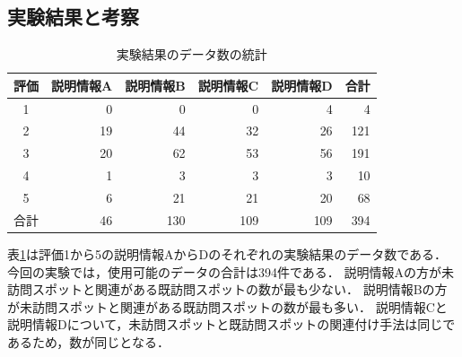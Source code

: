 \documentclass{deimj}
\begin{document}
\subsection{実験結果と考察}
\label{subsec:実験結果}

\begin{table}[t]
  \caption{実験結果のデータ数の統計}
  \label{table:実験結果のデータ数の統計}
  \centering
  \begin{tabular}{c|r|r|r|r|r}
  \hline
  評価 & \multicolumn{1}{c|}{説明情報A} & \multicolumn{1}{c|}{説明情報B} & \multicolumn{1}{c|}{説明情報C} & \multicolumn{1}{c|}{説明情報D} & \multicolumn{1}{c}{合計} \\ \hline
  1  & 0                      & 0                      & 0                      & 4                      & 4                      \\
  2  & 19                     & 44                     & 32                     & 26                     & 121                    \\
  3  & 20                     & 62                     & 53                     & 56                     & 191                    \\
  4  & 1                      & 3                      & 3                      & 3                      & 10                     \\
  5  & 6                      & 21                     & 21                     & 20                     & 68                     \\\hline
  合計 & 46                     & 130                    & 109                    & 109                    & 394                    \\ \hline
  \end{tabular}
\end{table}

表\ref{table:実験結果のデータ数の統計}は評価1から5の説明情報AからDのそれぞれの実験結果のデータ数である．
今回の実験では，使用可能のデータの合計は394件である．
説明情報Aの方が未訪問スポットと関連がある既訪問スポットの数が最も少ない．
説明情報Bの方が未訪問スポットと関連がある既訪問スポットの数が最も多い．
説明情報Cと説明情報Dについて，未訪問スポットと既訪問スポットの関連付け手法は同じであるため，数が同じとなる．
\end{document}
